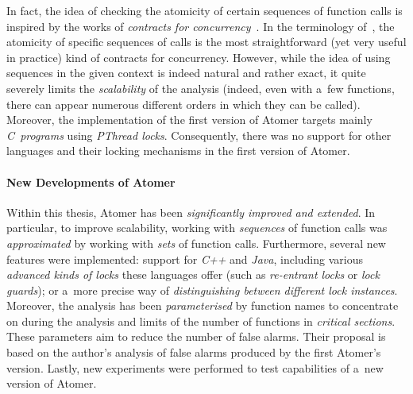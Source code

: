 In fact, the idea of checking the atomicity of certain sequences of function calls is inspired by the works of \emph{contracts for concurrency}~\cite{contracts2017, contracts2015}. In the terminology of~\cite{contracts2017, contracts2015}, the atomicity of specific sequences of calls is the most straightforward (yet very useful in practice) kind of contracts for concurrency. However, while the idea of using sequences in the given context is indeed natural and rather exact, it quite severely limits the \emph{scalability} of the analysis (indeed, even with a~few functions, there can appear numerous different orders in which they can be called). Moreover, the implementation of the first version of Atomer targets mainly \emph{C~programs} using \emph{PThread locks}. Consequently, there was no support for other languages and their locking mechanisms in the first version of Atomer.

\paragraph{New Developments of Atomer}
Within this thesis, Atomer has been \emph{significantly improved and extended}. In particular, to improve scalability, working with \emph{sequences} of function calls was \emph{approximated} by working with \emph{sets} of function calls. Furthermore, several new features were implemented: support for \emph{C++} and \emph{Java}, including various \emph{advanced kinds of locks} these languages offer (such as \emph{re-entrant locks} or \emph{lock guards}); or a~more precise way of \emph{distinguishing between different lock instances}. Moreover, the analysis has been \emph{parameterised} by function names to concentrate on during the analysis and limits of the number of functions in \emph{critical sections}. These parameters aim to reduce the number of false alarms. Their proposal is based on the author's analysis of false alarms produced by the first Atomer's version. Lastly, new experiments were performed to test capabilities of a~new version of Atomer.

